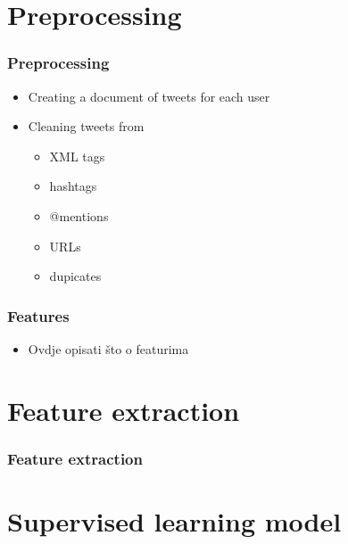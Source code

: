 \documentclass[slidestop,compress,11pt,xcolor=dvipsnames]{beamer}
\begin{document}

\section{Preprocessing}


\begin{frame}
\frametitle{Preprocessing}
\begin{itemize}
	\item Creating a document of tweets for each user
	\item Cleaning tweets from
	\begin{itemize}
		\item XML tags
		\item hashtags
		\item @mentions
		\item URLs
		\item dupicates
	\end{itemize}
\end{itemize}
\end{frame}


\begin{frame}
\frametitle{Features}
\begin{itemize}
	\item Ovdje opisati što o featurima
\end{itemize}
\end{frame}


\section{Feature extraction}


\begin{frame}
\frametitle{Feature extraction}


\end{frame}

\section{Supervised learning model}
\end{document}
